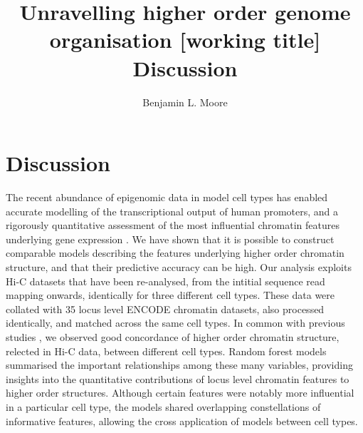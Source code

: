 \documentclass[a4paper,10pt,oneside]{book}
\title{ \vspace{3in} Unravelling higher order genome organisation {\small [working
    title]} \\ \vspace{2em} {\large {\bf Discussion}} }
\author{Benjamin L. Moore}
\begin{document}

\chapter{Discussion}

The recent abundance of epigenomic data in model cell types has
enabled accurate modelling of the transcriptional output of human
promoters, and a rigorously quantitative assessment of the most
influential chromatin features underlying gene expression
\cite{Dong2012}. We have shown that it is possible to construct
comparable models describing the features underlying higher order
chromatin structure, and that their predictive accuracy can be
high. Our analysis exploits Hi-C datasets that have been re-analysed,
from the intitial sequence read mapping onwards, identically for three
different cell types. These data were collated with 35 locus level
ENCODE chromatin datasets, also processed identically, and matched
across the same cell types. In common with previous studies
\cite{Chambers2013, Dixon2012}, we observed good concordance of higher
order chromatin structure, relected in Hi-C data, between different
cell types. Random forest models summarised the important
relationships among these many variables, providing insights into the
quantitative contributions of locus level chromatin features to higher
order structures. Although certain features were notably more
influential in a particular cell type, the models shared overlapping
constellations of informative features, allowing the cross application
of models between cell types.
\end{document}
